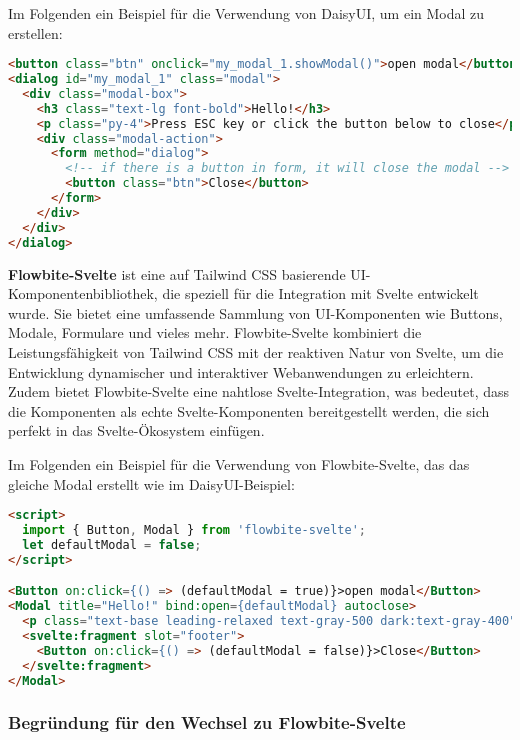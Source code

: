 Im Folgenden ein Beispiel für die Verwendung von DaisyUI, um ein Modal zu erstellen:

\begin{lstlisting}[language=html, caption={Code Ausschnitt DaisyUI Beispiel}]
<button class="btn" onclick="my_modal_1.showModal()">open modal</button>
<dialog id="my_modal_1" class="modal">
  <div class="modal-box">
    <h3 class="text-lg font-bold">Hello!</h3>
    <p class="py-4">Press ESC key or click the button below to close</p>
    <div class="modal-action">
      <form method="dialog">
        <!-- if there is a button in form, it will close the modal -->
        <button class="btn">Close</button>
      </form>
    </div>
  </div>
</dialog>
\end{lstlisting}

\textbf{Flowbite-Svelte} ist eine auf Tailwind CSS basierende UI-Komponentenbibliothek, die speziell für die Integration mit Svelte entwickelt wurde. Sie bietet eine umfassende Sammlung von UI-Komponenten wie Buttons, Modale, Formulare und vieles mehr. Flowbite-Svelte kombiniert die Leistungsfähigkeit von Tailwind CSS mit der reaktiven Natur von Svelte, um die Entwicklung dynamischer und interaktiver Webanwendungen zu erleichtern. Zudem bietet Flowbite-Svelte eine nahtlose Svelte-Integration, was bedeutet, dass die Komponenten als echte Svelte-Komponenten bereitgestellt werden, die sich perfekt in das Svelte-Ökosystem einfügen. 

Im Folgenden ein Beispiel für die Verwendung von Flowbite-Svelte, das das gleiche Modal erstellt wie im DaisyUI-Beispiel:

\begin{lstlisting}[language=html, caption={Code Ausschnitt Flowbite-Svelte Beispiel}]
<script>
  import { Button, Modal } from 'flowbite-svelte';
  let defaultModal = false;
</script>

<Button on:click={() => (defaultModal = true)}>open modal</Button>
<Modal title="Hello!" bind:open={defaultModal} autoclose>
  <p class="text-base leading-relaxed text-gray-500 dark:text-gray-400">Press ESC key or click the button below to close</p>
  <svelte:fragment slot="footer">
    <Button on:click={() => (defaultModal = false)}>Close</Button>
  </svelte:fragment>
</Modal>
\end{lstlisting}

\subsubsection{Begründung für den Wechsel zu Flowbite-Svelte}

